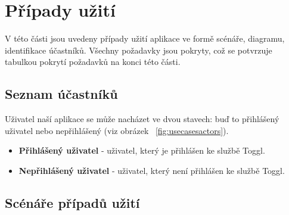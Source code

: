 \documentclass[thesis=B,czech]{FITthesis}[2012/06/26]
\begin{document}
\section{Případy užití}

V této části jsou uvedeny případy užití aplikace ve formě scénáře, diagramu, identifikace účastníků. Všechny požadavky jsou pokryty, což se potvrzuje tabulkou pokrytí požadavků na konci této části. 

\subsection{Seznam účastníků}

Uživatel naší aplikace se může nacházet ve dvou stavech: buď to přihlášený uživatel nebo nepřihlášený (viz obrázek ~\ref{fig:usecasesactors}). \\

\begin{itemize}
	\item \textbf{Přihlášený uživatel} - uživatel, který je přihlášen ke službě Toggl.
	\item \textbf{Nepřihlášený uživatel} - uživatel, který není přihlášen ke službě Toggl. 
\end{itemize}



\begin{figure}[h!]
\end{figure}
\newpage
\subsection{Scénáře případů užití}
\end{document}

